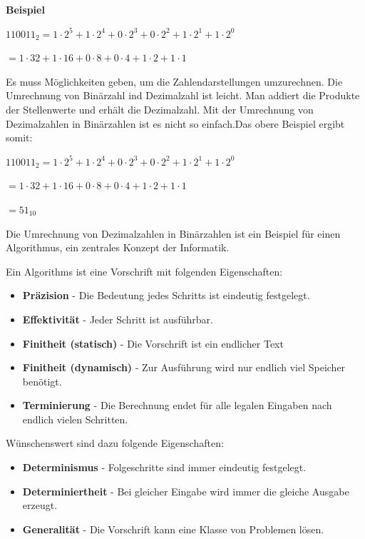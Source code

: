 \documentclass[
  11pt,
  a4paper,
  DIV=11,
  numbers=noendperiod]{scrartcl}
\begin{document}
\textbf{Beispiel}

\(110011_2 = 1 \cdot 2^5 +1 \cdot 2^4 +0\cdot 2^3+0 \cdot 2^2 + 1 \cdot 2^1 + 1 \cdot 2^0\)

\(= 1 \cdot 32 + 1\cdot16 + 0\cdot 8+ 0\cdot 4+ 1\cdot 2+1\cdot 1\)

Es muss Möglichkeiten geben, um die Zahlendarstellungen umzurechnen. Die
Umrechnung von Binärzahl ind Dezimalzahl ist leicht. Man addiert die
Produkte der Stellenwerte und erhält die Dezimalzahl. Mit der Umrechnung
von Dezimalzahlen in Binärzahlen ist es nicht so einfach.Das obere
Beispiel ergibt somit:

\(110011_2 = 1 \cdot 2^5 +1 \cdot 2^4 +0\cdot 2^3+0 \cdot 2^2 + 1 \cdot 2^1 + 1 \cdot 2^0\)

\(= 1 \cdot 32 + 1\cdot16 + 0\cdot 8+ 0\cdot 4+ 1\cdot 2+1\cdot 1\)

\(= 51_{10}\)

Die Umrechnung von Dezimalzahlen in Binärzahlen ist ein Beispiel für
einen Algorithmus, ein zentrales Konzept der Informatik.

\begin{tcolorbox}[enhanced jigsaw, bottomrule=.15mm, arc=.35mm, colframe=quarto-callout-note-color-frame, left=2mm, opacitybacktitle=0.6, colback=white, breakable, title=\textcolor{quarto-callout-note-color}{\faInfo}\hspace{0.5em}{Definition}, titlerule=0mm, toprule=.15mm, rightrule=.15mm, leftrule=.75mm, colbacktitle=quarto-callout-note-color!10!white, coltitle=black, opacityback=0, toptitle=1mm, bottomtitle=1mm]

Ein Algorithms ist eine Vorschrift mit folgenden Eigenschaften:

\begin{itemize}
\item
  \textbf{Präzision} - Die Bedeutung jedes Schritts ist eindeutig
  festgelegt.
\item
  \textbf{Effektivität} - Jeder Schritt ist ausführbar.
\item
  \textbf{Finitheit (statisch)} - Die Vorschrift ist ein endlicher Text
\item
  \textbf{Finitheit (dynamisch)} - Zur Ausführung wird nur endlich viel
  Speicher benötigt.
\item
  \textbf{Terminierung} - Die Berechnung endet für alle legalen Eingaben
  nach endlich vielen Schritten.
\end{itemize}

Wünschenswert sind dazu folgende Eigenschaften:

\begin{itemize}
\item
  \textbf{Determinismus} - Folgeschritte sind immer eindeutig
  festgelegt.
\item
  \textbf{Determiniertheit} - Bei gleicher Eingabe wird immer die
  gleiche Ausgabe erzeugt.
\item
  \textbf{Generalität} - Die Vorschrift kann eine Klasse von Problemen
  lösen.
\end{itemize}

\end{tcolorbox}
\end{document}
